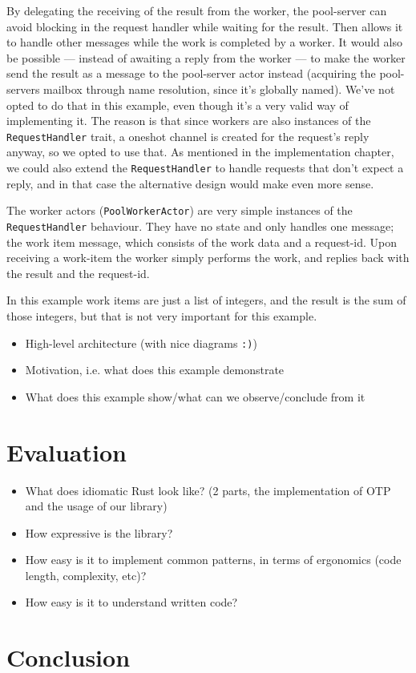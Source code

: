 \documentclass[a4paper]{article}
\begin{document}
By delegating the receiving of the result from the worker, the pool-server can
avoid blocking in the request handler while waiting for the result. Then allows
it to handle other messages while the work is completed by a worker. It would
also be possible --- instead of awaiting a reply from the worker --- to make the
worker send the result as a message to the pool-server actor instead (acquiring
the pool-servers mailbox through name resolution, since it's globally named).
We've not opted to do that in this example, even though it's a very valid way of
implementing it. The reason is that since workers are also instances of the
\texttt{RequestHandler} trait, a oneshot channel is created for the request's
reply anyway, so we opted to use that. As mentioned in the implementation
chapter, we could also extend the \texttt{RequestHandler} to handle requests
that don't expect a reply, and in that case the alternative design would make
even more sense.

The worker actors (\texttt{PoolWorkerActor}) are very simple instances of the
\texttt{RequestHandler} behaviour. They have no state and only handles one
message; the work item message, which consists of the work data and a
request-id. Upon receiving a work-item the worker simply performs the work, and
replies back with the result and the request-id.

In this example work items are just a list of integers, and the result is the
sum of those integers, but that is not very important for this example.

%


\begin{itemize}
\item High-level architecture (with nice diagrams \texttt{:)})
\item Motivation, i.e. what does this example demonstrate
\item What does this example show/what can we observe/conclude from it
\end{itemize}

\section{Evaluation}
\begin{itemize}
\item What does idiomatic Rust look like? (2 parts, the implementation of OTP
  and the usage of our library)
\item How expressive is the library?
\item How easy is it to implement common patterns, in terms of ergonomics (code
  length, complexity, etc)?
\item How easy is it to understand written code?
\end{itemize}

\section{Conclusion}
\end{document}
